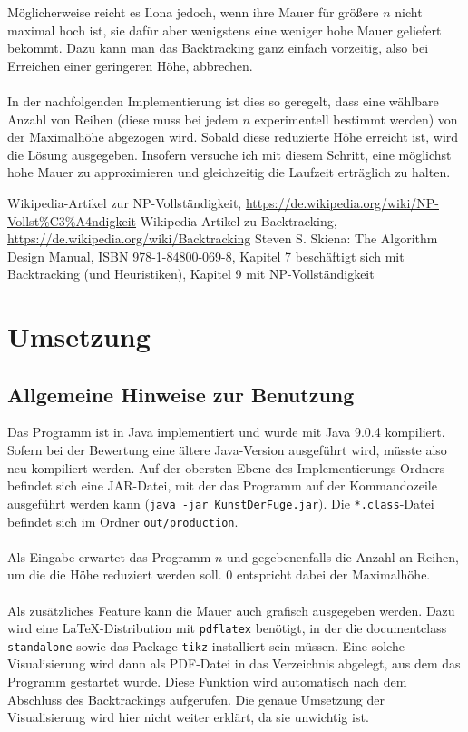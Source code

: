 \documentclass[a4paper, notitlepage, 12pt]{scrartcl}
\begin{document}
Möglicherweise reicht es Ilona jedoch, wenn ihre Mauer für größere $n$ nicht maximal hoch ist, sie dafür aber wenigstens eine weniger hohe Mauer geliefert bekommt. Dazu kann man das Backtracking ganz einfach vorzeitig, also bei Erreichen einer geringeren Höhe, abbrechen. \\ \\ In der nachfolgenden Implementierung ist dies so geregelt, dass eine wählbare Anzahl von Reihen (diese muss bei jedem $n$ experimentell bestimmt werden) von der Maximalhöhe abgezogen wird. Sobald diese reduzierte Höhe erreicht ist, wird die Lösung ausgegeben. Insofern versuche ich mit diesem Schritt, eine möglichst hohe Mauer zu approximieren und gleichzeitig die Laufzeit erträglich zu halten.
\begin{thebibliography}{xx}
 Wikipedia-Artikel zur NP-Vollständigkeit, \url{https://de.wikipedia.org/wiki/NP-Vollst\%C3\%A4ndigkeit}
 Wikipedia-Artikel zu Backtracking, \url{https://de.wikipedia.org/wiki/Backtracking}
 Steven S. Skiena: The Algorithm Design Manual, ISBN 978-1-84800-069-8, Kapitel 7 beschäftigt sich mit Backtracking (und Heuristiken), Kapitel 9 mit NP-Vollständigkeit
\end{thebibliography}
\section{Umsetzung}
\subsection{Allgemeine Hinweise zur Benutzung}
Das Programm ist in Java implementiert und wurde mit Java 9.0.4 kompiliert. Sofern bei der Bewertung eine ältere Java-Version ausgeführt wird, müsste also neu kompiliert werden. Auf der obersten Ebene des Implementierungs-Ordners befindet sich eine JAR-Datei, mit der das Programm auf der Kommandozeile ausgeführt werden kann (\texttt{java -jar KunstDerFuge.jar}). Die \texttt{*.class}-Datei befindet sich im Ordner \texttt{out/production}. \\ \\
Als Eingabe erwartet das Programm $n$ und gegebenenfalls die Anzahl an Reihen, um die die Höhe reduziert werden soll. 0 entspricht dabei der Maximalhöhe. \\ \\
Als zusätzliches Feature kann die Mauer auch grafisch ausgegeben werden. Dazu wird eine LaTeX-Distribution mit \texttt{pdflatex} benötigt, in der die documentclass \texttt{standalone} sowie das Package \texttt{tikz} installiert sein müssen. Eine solche Visualisierung wird dann als PDF-Datei in das Verzeichnis abgelegt, aus dem das Programm gestartet wurde. Diese Funktion wird automatisch nach dem Abschluss des Backtrackings aufgerufen. Die genaue Umsetzung der Visualisierung wird hier nicht weiter erklärt, da sie unwichtig ist.
\end{document}
